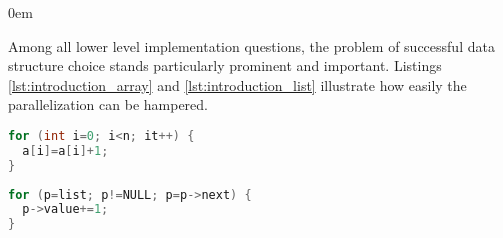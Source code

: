 \begin{description}[style=unboxed,leftmargin=0cm]
\itemsep0em
\item[\textit{Data-centric parallelization (DCP) problem}] Among all lower level implementation questions, the problem of successful data structure choice stands particularly prominent and important. Listings \ref{lst:introduction_array} and \ref{lst:introduction_list} illustrate how easily the parallelization can be hampered.\newline\null
\begin{minipage}[t]{0.45\linewidth}
\begin{lstlisting}[caption={Parallelisable loop operating on a \textbf{linear array}.},label={lst:introduction_array},language=C]
for (int i=0; i<n; it++) {
  a[i]=a[i]+1;
}
\end{lstlisting}
\end{minipage}
%
\begin{minipage}[t]{0.5\linewidth}
\begin{lstlisting}[caption={Non-parallelisable loop operating on a \textbf{linked-list}.},label={lst:introduction_list},language=C]
for (p=list; p!=NULL; p=p->next) {
  p->value+=1;
}
\end{lstlisting}
\end{minipage}


\end{description}
